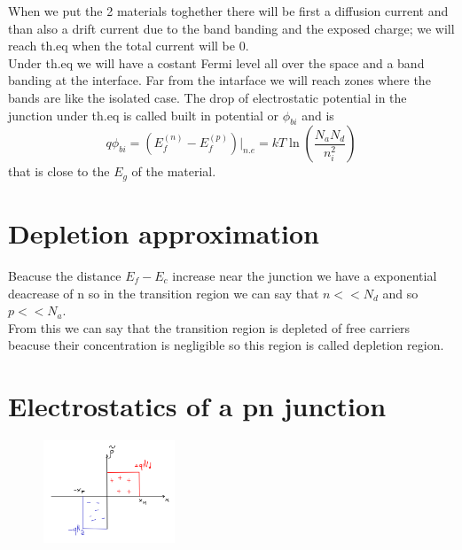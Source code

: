 When we put the 2 materials toghether there will be first a diffusion current and than also a drift current due to the band banding and the exposed charge; we will reach th.eq when the total current will be 0.\\Under th.eq we will have a costant Fermi level all over the space and a band banding at the interface. Far from the intarface we will reach zones where the bands are like the isolated case. The drop of electrostatic potential in the junction under th.eq is called built in potential or $\phi_{bi}$ and is 
\begin{equation}
q\phi_{bi}=(E_f^{(n)}-E_f^{(p)})|_{n.e}=kT\ln(\frac{N_aN_d}{n_i^2})
\end{equation} 
that is close to the $E_g$ of the material.\\
\section{Depletion approximation}
Beacuse the distance $E_f-E_c$ increase near the junction we have a exponential deacrease of n so in the transition region we can say that $n<<N_d$ and so $p<<N_a$.\\
From this we can say that the transition region is depleted of free carriers beacuse their concentration is negligible so this region is called depletion region.
\section{Electrostatics of a pn junction}

\begin{figure}
\includegraphics[width=0.35\textwidth]{pn3.png}
\end{figure}

